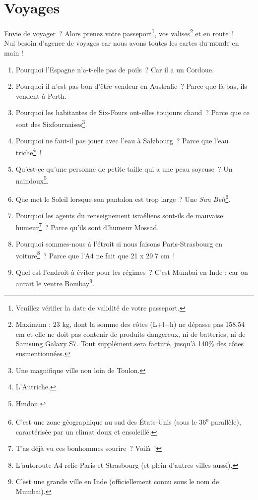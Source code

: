 \documentclass[10pt,a5paper,fullpage]{book}
\begin{document}
	\chapter{Voyages}
	Envie de voyager~? Alors prenez votre passeport\footnote{Veuillez vérifier la date de validité de votre passeport.}, vos valises\footnote{Maximum : 23 kg, dont la somme des côtes (L+l+h) ne dépasse pas 158.54 cm et elle ne doit pas contenir de produits dangereux, ni de batteries, ni de Samsung Galaxy S7. Tout supplément sera facturé, jusqu'à 140\% des côtes susmentionnées.} et en route~!
	\\Nul besoin d'agence de voyages car nous avons toutes les cartes \sout{du monde} en main ! 
	
	\newpage
	\begin{enumerate}
		\item Pourquoi l’Espagne n’a-t-elle pas de poils~? Car il a un Cordoue.
		\item Pourquoi il n'est pas bon d'être vendeur en Australie~? Parce que là-bas, ils vendent à Perth. 
		\item Pourquoi les habitantes de Six-Fours ont-elles toujours chaud~? Parce que ce sont des Sixfournaises\footnote{Une magnifique ville non loin de Toulon.}. %
		\item Pourquoi ne faut-il pas jouer avec l’eau à Salzbourg~? Parce que l’eau triche\footnote{L'Autriche.}~!
		\item Qu’est-ce qu’une personne de petite taille qui a une peau soyeuse~? Un naindoux\footnote{Hindou.}.
		\item Que met le Soleil lorsque son pantalon est trop large~? Une \textit{Sun Belt}\footnote{C'est une zone géographique au sud des États-Unis (sous le 36\textsuperscript{e} parallèle), caractérisée par un climat doux et ensoleillé.}.
		\item Pourquoi les agents du renseignement israéliens sont-ils de mauvaise humeur\footnote{T'as déjà vu ces bonhommes sourire~? Voilà~!}~? Parce qu’ils sont d’humeur Mossad.
		\item Pourquoi sommes-nous à l'étroit si nous faisons Paris-Strasbourg en voiture\footnote{L’autoroute A4 relie Paris et Strasbourg (et plein d’autres villes aussi).}~? Parce que l'A4 ne fait que 21 x 29.7 cm~!
		\item Quel est l'endroit à éviter pour les régimes~? C'est Mumbai en Inde : car on aurait le ventre Bombay\footnote{C’est une grande ville en Inde (officiellement connu sous le nom de Mumbai).}. 

\end{enumerate}
\end{document}
